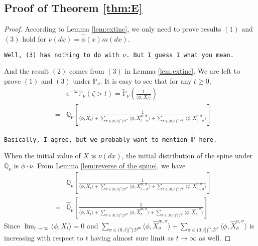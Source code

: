 \documentclass[12pt,a4paper]{amsart}
\numberwithin{equation}{section}
\theoremstyle{plain}
\theoremstyle{definition}
\theoremstyle{remark}
\begin{document}
\subsection{Proof of Theorem \ref{thm:E}}
\begin{proof}
According to Lemma \ref{lem:extinc}, we only need to prove results $(1)$ and $(3)$ hold for $\nu(dx)=\hat\phi(x)m(dx)$.  

{\tt Well, (3) has nothing to do with $\nu$. But I guess I what you mean.}

And the result $(2)$ comes from $(3)$ in Lemma \ref{lem:extinc}.  We are left to prove $(1)$ and $(3)$ under $\mathbb P_{\nu}$.  It is easy to see that for any $t\ge 0,$
\begin{eqnarray*}\label{subcritical equality}
 	&&e^{-\lambda t}\mathbb P_\nu(\zeta>t)=\widetilde{\mathbb P}_\nu\left(\frac{1}{\langle\phi, X_{t}\rangle }\right)\\
 &=&\mathbb Q_{\nu}\left[\frac{1}{\langle\phi, X_{t}\rangle +\sum_{\sigma\in(0, t]\bigcap\mathcal D^{\mathrm m}}\langle \phi, X_{t-\sigma}^{{\mathrm m},\sigma}\rangle +\sum_{\sigma\in (0, t]\bigcap \mathcal D^{\mathrm n}}\langle \phi, X_{t-\sigma}^{{\mathrm n}, \sigma}\rangle} \right]
\end{eqnarray*}
	
	{\tt Basically, I agree, but we probably want to mention $\widetilde {\mathbb P}$ here.}
	
When the initial value of $X$ is $\nu(dx)$, the initial distribution of the spine under $\mathbb Q_\nu$ is $\phi\cdot\nu$.
	From Lemma \ref{lem:reverse of the spine}, we have
\begin{eqnarray*}\label{duality}
    &&  \mathbb Q_{\nu}\left[\frac{1}{\langle\phi, X_{t}\rangle +\sum_{\sigma\in(0, t]\bigcap\mathcal D^{\mathrm m}}\langle \phi, X_{t-\sigma}^{{\mathrm m},\sigma}\rangle +\sum_{\sigma\in (0, t]\bigcap \mathcal D^{\mathrm n}}\langle \phi, X_{t-\sigma}^{{\mathrm n}, \sigma}\rangle }\right]\\
    &=&\widehat{\mathbb Q}_{\nu}\left[\frac{1}{\langle\phi, X_{t}\rangle +\sum_{\sigma\in(0, t]\bigcap\mathcal D^{\mathrm m}}\langle \phi, \widehat X_{\sigma}^{{\mathrm m},\sigma}\rangle +\sum_{\sigma\in (0, t]\bigcap \mathcal D^{\mathrm n}}\langle \phi, \widehat X_{\sigma}^{{\mathrm n},\sigma}\rangle }\right]
\end{eqnarray*}
    Since $\lim_{t\to\infty}\langle\phi, X_{t}\rangle=0$ and $\sum_{\sigma\in(0, t]\bigcap\mathcal D^{\mathrm m}}\langle \phi, \widehat X_{\sigma}^{{\mathrm m},\sigma}\rangle +\sum_{\sigma\in (0, t]\bigcap \mathcal D^{\mathrm n}}\langle \phi, \widehat X_{\sigma}^{{\mathrm n},\sigma}\rangle $ is increasing with respect to $t$ having almost sure limit as $t\to\infty$ as well.  
    

\end{proof}
\end{document}

